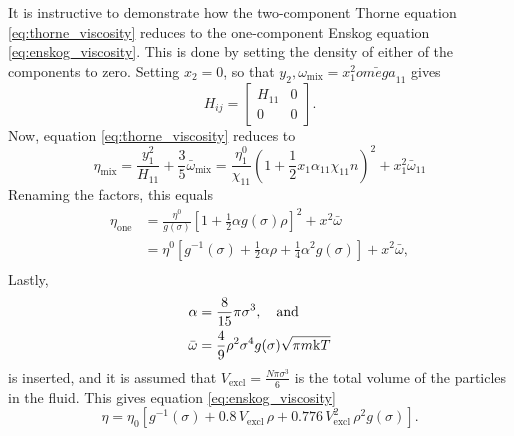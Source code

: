 
It is instructive to demonstrate how the two-component 
Thorne equation \eqref{eq:thorne_viscosity} reduces to 
the one-component Enskog equation \eqref{eq:enskog_viscosity}.
This is done by setting the density of either of the 
components to zero. Setting \(x_2 = 0\), so that 
\(y_2, \omega_\text{mix} = x_1^2\bar{omega}_{11}\)
gives 
\[
    H_{ij} = 
    \begin{bmatrix}
        H_{11}  & 0 \\
        0       & 0
    \end{bmatrix}.
\]
Now, equation \eqref{eq:thorne_viscosity} reduces to 
\[
    \eta_{\text{mix}} 
        = \frac{y_1^2}{H_{11}} 
        + \frac{3}{5} \bar{\omega}_{\text{mix}}
        = \frac{\eta^0_1}{\chi_{11}} \left(
            1   + \frac{1}{2} x_1 \alpha_{11} \chi_{11} n 
        \right)^2
        + x_1^2\bar{\omega}_{11}
\]
Renaming the factors, this equals
\[
    \begin{split}
    \eta_{\text{one}} 
        &= \frac{\eta^0}{g(\sigma)} \left[
            1+\frac{1}{2} \alpha g(\sigma) \rho
        \right]^2
        + x^2\bar{\omega} \\
        &= \eta^0\left[
            g^{-1}(\sigma) 
            + \frac{1}{2} \alpha \rho 
            + \frac{1}{4} \alpha^2 g(\sigma)
        \right]
        + x^2\bar{\omega}, \\
    \end{split}
\]
Lastly, 
\[
    \begin{split}
    \alpha
        &= \frac{8}{15} \pi \sigma^3, \quad \text{and} \\
    \bar{\omega}
        &= \frac{4}{9} \rho^2 \sigma^4 g(\sigma) \sqrt{\pi m \mathrm{k} T}
    \end{split}
\]
is inserted, and it is assumed that                 %
\(V_{\text{excl}} = \frac{N \pi \sigma^3}{6}\) 
is the total volume of the particles in the fluid.
This gives equation \eqref{eq:enskog_viscosity}
\[
    \eta 
        = \eta_0 \left[g^{-1}(\sigma) 
        + 0.8   \, V_{\text{excl}}      \,\rho 
        + 0.776 \, V_{\text{excl}}^2    \,\rho^2 g(\sigma) 
        \right].
\]

